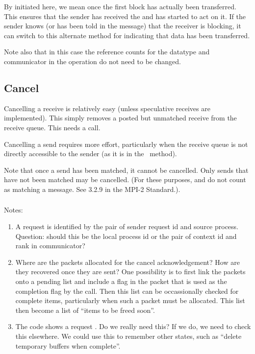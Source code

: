 By initiated here, we mean once the first block has actually been
transferred.  This ensures that the sender has received the
 and has started to act on it.  If the sender
knows (or has been told in the  message) that
the receiver is blocking, it can switch to this alternate method for
indicating that data has been transferred.

Note also that in this case the reference counts for the datatype and
communicator in the operation do not need to be changed.

\subsection{Cancel}
Cancelling a receive is relatively easy (unless speculative receives
are implemented).   This simply removes a posted but unmatched receive
from the receive queue.  This needs a
 call.

Cancelling a send requires more effort, particularly when the receive
queue is not directly accessible to the sender (as it is in the
\shmemname\ method).  

Note that once a send has been matched, it cannot be cancelled.  Only sends
that have not been matched may be cancelled. (For these purposes,
 and  do not count as matching a
message.  See 3.2.9 in the MPI-2 Standard.).

\subsubsection{\tcpname}
\ifcodefirst
{}
\fi

Notes:
\begin{enumerate}
\item A request is identified by the pair of sender request id and
source process.  Question: should this be the local process id or the
pair of context id and rank in communicator?

\item Where are the packets allocated for the cancel acknowledgement?
How are they recovered once 
they are sent? One possibility is to first link the packets onto a
pending list and include a flag in the packet that is used as the
completion flag by the  call.  Then this list can
be occassionally checked for complete items, particularly when such a
packet must be allocated.  This list then become a list of ``items to
be freed soon''.

\item The code shows a request .  Do we really need this?
If we do, we need to check this elsewhere.  We could use this to
remember other states, such as ``delete temporary buffers when
complete''.

\end{enumerate}

